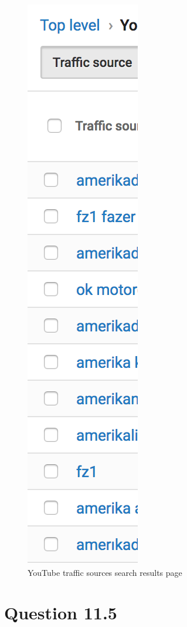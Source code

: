\documentclass[10pt,letterpaper,bibliography=totoc]{scrartcl}
\begin{document}
\begin{figure}[h!]
\centering
\label{fig:youtube-analytics}
\includegraphics[scale=.5]{youtube-analytics.png}
\caption{YouTube traffic sources search results page}
\end{figure}

\section{Question 11.5}
\end{document}
